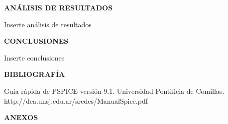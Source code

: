 \documentclass[12pt]{article}
\begin{document}
	\newpage
	
	\begin{center}
		\textbf{\large ANÁLISIS DE RESULTADOS}\\
	\end{center}
	
	Inserte análisis de resultados
	
	\newpage
	
	\begin{center}
		\textbf{\large CONCLUSIONES}\\
	\end{center}
	
	Inserte conclusiones
	
	\newpage
	
	\begin{center}
		\textbf{\large BIBLIOGRAFÍA}\\
	\end{center}
	
	Guía rápida de PSPICE versión 9.1. Universidad Pontificia de Comillas.\\
	http://dea.unsj.edu.ar/sredes/ManualSpice.pdf
	
	\newpage
	
	\begin{center}
		\textbf{\large ANEXOS}\\
	\end{center}
	
\end{document}
